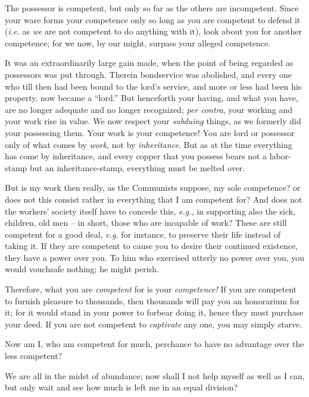 The possessor is competent, but only so far as the others are incompetent. 
Since your ware forms your competence only so long as you are competent to 
defend it (\textit{i.e.} as \textit{we} are not competent to do anything with 
it), look about you for another competence; for we now, by our might, surpass 
your alleged competence.

It was an extraordinarily large gain made, when the point of being regarded as 
possessors was put through. Therein bondservice was abolished, and every one 
who till then had been bound to the lord's service, and more or less had been 
his property, now became a ``lord.'' But henceforth your having, and what 
you have, are no longer adequate and no longer recognized; \textit{per 
contra}, your working and your work rise in value. We now respect your 
\textit{subduing} things, as we formerly did your possessing them. Your work 
is your competence! You are lord or possessor only of what comes by 
\textit{work}, not by \textit{inheritance}. But as at the time everything has 
come by inheritance, and every copper that you possess bears not a labor-stamp 
but an inheritance-stamp, everything must be melted over.

But is my work then really, as the Communists suppose, my sole competence? or 
does not this consist rather in everything that I am competent for? And does 
not the workers' society itself have to concede this, \textit{e.g.,} in 
supporting also the sick, children, old men -- in short, those who are 
incapable of work? These are still competent for a good deal, \textit{e.g.} 
for instance, to preserve their life instead of taking it. If they are 
competent to cause you to desire their continued existence, they have a power 
over you. To him who exercised utterly no power over you, you would vouchsafe 
nothing; he might perish.

Therefore, what you are \textit{competent} for is your \textit{competence!} If 
you are competent to furnish pleasure to thousands, then thousands will pay 
you an honorarium for it; for it would stand in your power to forbear doing 
it, hence they must purchase your deed. If you are not competent to 
\textit{captivate} any one, you may simply starve.

Now am I, who am competent for much, perchance to have no advantage over the 
less competent?

We are all in the midst of abundance; now shall I not help myself as well as I 
can, but only wait and see how much is left me in an equal division?

